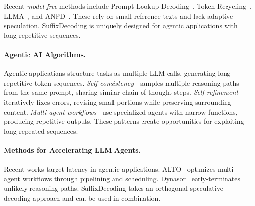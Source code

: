 Recent \emph{model-free} methods include Prompt Lookup Decoding~\citep{saxena2023prompt}, Token Recycling~\citep{luo2024turningtrashtreasureaccelerating}, LLMA~\citep{yang2023inferencereferencelosslessacceleration}, and ANPD~\citep{ou2024losslessaccelerationlargelanguage}. These rely on small reference texts and lack adaptive speculation. SuffixDecoding is uniquely designed for agentic applications with long repetitive sequences.

\paragraph{Agentic AI Algorithms.}

Agentic applications structure tasks as multiple LLM calls, generating long repetitive token sequences. \emph{Self-consistency~\citep{wang2023selfconsistencyimproveschainthought}} samples multiple reasoning paths from the same prompt, sharing similar chain-of-thought steps. \emph{Self-refinement~\citep{madaan2023selfrefineiterativerefinementselffeedback}} iteratively fixes errors, revising small portions while preserving surrounding content. \emph{Multi-agent workflows~\citep{khot2023decomposedpromptingmodularapproach}} use specialized agents with narrow functions, producing repetitive outputs. These patterns create opportunities for exploiting long repeated sequences.

\paragraph{Methods for Accelerating LLM Agents.}

Recent works target latency in agentic applications. ALTO~\citep{10.1145/3642970.3655844} optimizes multi-agent workflows through pipelining and scheduling. Dynasor~\citep{fu2024efficientlyservingllmreasoning} early-terminates unlikely reasoning paths. SuffixDecoding takes an orthogonal speculative decoding approach and can be used in combination.


